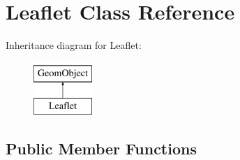 \hypertarget{classLeaflet}{}\section{Leaflet Class Reference}
\label{classLeaflet}
Inheritance diagram for Leaflet\+:\begin{figure}[H]
\begin{center}
\leavevmode
\includegraphics[height=2.000000cm]{classLeaflet}
\end{center}
\end{figure}
\subsection*{Public Member Functions}
